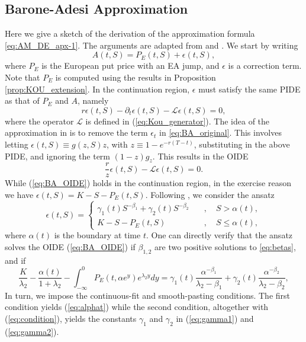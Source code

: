 \documentclass[11pt]{article}
\numberwithin{equation}{section}
\numberwithin{theorem}{section}
\begin{document}
\subsection{Barone-Adesi Approximation} Here we  give a sketch of the derivation of the approximation formula \eqref{eq:AM_DE_apx-1}. The     arguments are adapted from  \citet{Barone-Adesi1987} and \citet{Kou2004}. We start by writing
\[
A\left(t,S\right)=P_{E}\left(t,S\right)+\epsilon\left(t,S\right),
\]
where $P_{E}$ is the European put price with an EA jump, and $\epsilon$ is a correction
term. Note that $P_E$ is computed  using   the results in Proposition
\ref{prop:KOU_extension}. In the continuation region, $\epsilon$ must satisfy the same PIDE as that of  $P_{E}$ and $A$, namely
\begin{equation}
r\epsilon\left(t,S\right)-\partial_t\epsilon\left(t,S\right)-\mathcal{L}\epsilon\left(t,S\right)=0,\label{eq:BA_original}
\end{equation}
where the operator $\mathcal{L}$ is defined  in (\ref{eq:Kou_generator}). The idea of the approximation in \citet{Barone-Adesi1987} is to remove the term $\epsilon_{t}$
in \eqref{eq:BA_original}. This involves letting   $\epsilon\left(t,S\right)\equiv g\left(z,S\right)z$,
with  $z\equiv1-e^{-r\left(T-t\right)}$, substituting in the above PIDE, and  ignoring the term $\left(1-z\right)g_{z}$. This results in  the OIDE
\begin{equation}
\frac{r}{z}\epsilon\left(t,S\right)-\mathcal{L}\epsilon\left(t,S\right)=0.\label{eq:BA_OIDE}
\end{equation}
While (\ref{eq:BA_OIDE}) holds in the continuation region, in the exercise reason we have $\epsilon\left(t,S\right)=K-S-P_{E}\left(t,S\right)$.  Following  \citet{Kou2004}, we consider  the ansatz\[
\epsilon\left(t,S\right)=\begin{cases}
\gamma_{1}\left(t\right)S^{-\beta_{1}}+\gamma_{2}\left(t\right)S^{-\beta_{2}} & \quad,\quad S>\alpha\left(t\right),\\
K-S-P_{E}\left(t,S\right) & \quad,\quad S\leq\alpha\left(t\right),
\end{cases}
\]
where $\alpha\left(t\right)$ is the boundary at time $t$. One can directly verify that the ansatz solves 
the OIDE (\ref{eq:BA_OIDE}) if $\beta_{1,2}$ 
are   two positive solutions to  \ref{eq:betas}, and if 
\begin{equation}
\frac{K}{\lambda_{2}}-\frac{\alpha\left(t\right)}{1+\lambda_{2}}-\int_{-\infty}^{0}P_{E}\left(t,\alpha e^{y}\right)e^{\lambda_{2}y}dy=\gamma_{1}\left(t\right)\frac{\alpha^{-\beta_{1}}}{\lambda_{2}-\beta_{1}}+\gamma_{2}\left(t\right)\frac{\alpha^{-\beta_{2}}}{\lambda_{2}-\beta_{2}},\label{eq:condition}
\end{equation}
In turn, we   impose the continuous-fit and smooth-pasting conditions. The first condition yields (\ref{eq:alphat}) while the second  condition, altogether with  
(\ref{eq:condition}), yields the constants $\gamma_1$ and $\gamma_2$ in (\ref{eq:gamma1}) and (\ref{eq:gamma2}).


\linespread{-1} 
\begin{small}


\end{small}
\end{document}
